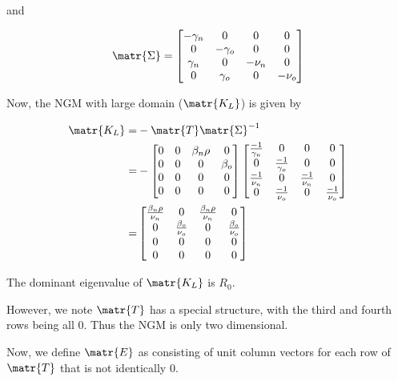\documentclass[11pt]{article}
\begin{document}
and

\[ \matr{\Sigma} =
	\begin{bmatrix}
		-\gamma_n &	0	&	0 & 	0 \\
		0 & 	-\gamma_o & 0 & 0 \\
		\gamma_n & 0 & 	-\nu_n &		0	\\
		0 & 	\gamma_o & 	0 & -\nu_o \\
	 \end{bmatrix}
 \]


Now, the NGM with large domain (\( \matr{K_L} \)) is given by

\begin{align*}
	\matr{K_L}	=&	-\matr{T}\matr{\Sigma}^{-1}\\
	=&	-\begin{bmatrix}
		0 &	0	&	\beta_n \rho & 	0 \\
		0 & 	0 & 0 & \beta_o \\
		0 & 0 & 	0 &		0	\\
		0 & 	0 & 	0 & 0 \\
	 \end{bmatrix}
	 \begin{bmatrix}
	 	\frac{-1}{\gamma_n} & 0 & 0 & 0 \\
	 	0 & \frac{-1}{\gamma_o} & 0 & 0 \\
	 	\frac{-1}{\nu_n} & 0 & \frac{-1}{\nu_n} & 0 \\
	 	0 & \frac{-1}{\nu_o} & 0 & \frac{-1}{\nu_o} \\
	 \end{bmatrix}\\
	 =& \begin{bmatrix} 
		 \frac{\beta_n \rho}{\nu_n} & 0 & \frac{\beta_n \rho}{\nu_n} & 0 \\
		0 & \frac{\beta_o}{\nu_o} & 0 & \frac{\beta_o}{\nu_o} \\
		0 & 0 & 0 & 0 \\
		0 & 0 & 0 & 0 \\
	  \end{bmatrix}
\end{align*}

The dominant eigenvalue of \( \matr{K_L} \) is \( R_0 \).

However, we  note \( \matr{T} \) has a special structure, with the third and fourth rows being all 0.
Thus the NGM is only two dimensional.

Now, we define \( \matr{E} \) as consisting of unit column vectors for each row of \( \matr{T} \) that is not identically 0.
\end{document}

